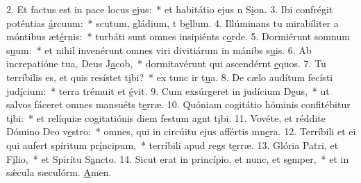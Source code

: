 2. Et factus est in pace locus \uline{e}jus:~* et habitátio ejus n S\uline{i}on.
3. Ibi confrégit poténtias \uline{á}rcuum:~* scutum, gládium, t b\uline{e}llum.
4. Illúminans tu mirabíliter a móntibus æt\uline{é}rnis:~* turbáti sunt omnes insipiénts c\uline{o}rde.
5. Dormiérunt somnum s\uline{u}um:~* et nihil invenérunt omnes viri divitiárum in mánibs s\uline{u}is.
6. Ab increpatióne tua, Deus J\uline{a}cob,~* dormitavérunt qui ascendérnt \uline{e}quos.
7. Tu terríbilis es, et quis resístet t\uline{i}bi?~* ex tunc ir t\uline{u}a.
8. De cælo audítum fecísti jud\uline{í}cium:~* terra trémuit et \uline{é}vit.
9. Cum exsúrgeret in judícium D\uline{e}us,~* ut salvos fáceret omnes mansuéts t\uline{e}rræ.
10. Quóniam cogitátio hóminis confitébitur t\uline{i}bi:~* et relíquiæ cogitatiónis diem festum agnt t\uline{i}bi.
11. Vovéte, et réddite Dómino Deo v\uline{e}stro:~* omnes, qui in circúitu ejus affértis mn\uline{e}ra.
12. Terríbili et ei qui aufert spíritum pr\uline{í}ncipum,~* terríbili apud regs t\uline{e}rræ.
13. Glória Patri, et F\uline{í}lio,~* et Spirítu S\uline{a}ncto.
14. Sicut erat in princípio, et nunc, et s\uline{e}mper,~* et in sǽcula sæculórm. \uline{A}men.

